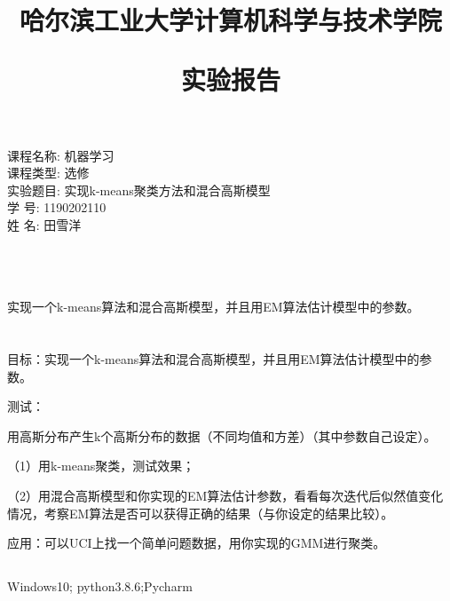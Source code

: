\documentclass[lang=cn,a4paper,cite=authoryear]{elegantpaper}
\title{\zihao{1}哈尔滨工业大学计算机科学与技术学院 \par 实验报告}
\date{}
\begin{document}
\maketitle
\thispagestyle{empty}
\begin{center}
   	{ 课程名称:  机器学习}\\[.5cm]
    { 课程类型:   选修}\\[.5cm]
    { 实验题目:  实现k-means聚类方法和混合高斯模型}\\[.5cm]
	{ 学 号:  1190202110}\\[.5cm]
	{ 姓 名: 田雪洋}\\[.5cm]
    { \date{\zhtoday}}\\[.50cm]
\end{center}


\newpage
{}
\section*{}
实现一个k-means算法和混合高斯模型，并且用EM算法估计模型中的参数。

\section*{}
\subsection*{}
目标：实现一个k-means算法和混合高斯模型，并且用EM算法估计模型中的参数。

\par 测试：
\par 用高斯分布产生k个高斯分布的数据（不同均值和方差）（其中参数自己设定）。
\par（1）用k-means聚类，测试效果；
\par（2）用混合高斯模型和你实现的EM算法估计参数，看看每次迭代后似然值变化情况，考察EM算法是否可以获得正确的结果（与你设定的结果比较）。

\par 应用：可以UCI上找一个简单问题数据，用你实现的GMM进行聚类。


\subsection*{}
Windows10; python3.8.6;Pycharm 
\section*{}
\end{document}
